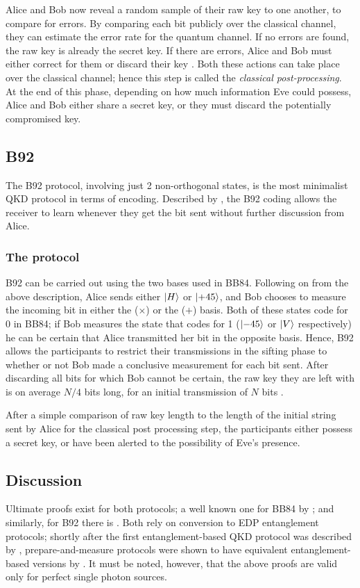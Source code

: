 \documentclass[paper=a4, fontsize=11pt]{scrartcl} %
\numberwithin{equation}{section} %
\numberwithin{figure}{section} %
\numberwithin{table}{section} %
\begin{document}
Alice and Bob now reveal a random sample of their raw key to one another, to compare for errors. By
comparing each bit publicly over the classical channel, they can estimate the error rate for
the quantum channel. If no errors are found, the raw key is already the secret key. If there are
errors, Alice and Bob must either correct for them or discard their key \citep{reviewScariani}. Both these actions can
take place over the classical channel; hence this step is called the \textit{classical post-processing}.
At the end of this phase, depending on how much information Eve could possess, Alice and Bob either share
a secret key, or they must discard the potentially compromised key.

\subsection{B92}
The B92 protocol, involving just 2 non-orthogonal states, is the
most minimalist QKD protocol in terms of encoding. Described by \citet{B92},
the B92 coding allows the receiver to learn whenever they get
the bit sent without further discussion from Alice.

\subsubsection*{The protocol}
B92 can be carried out using the two bases used in BB84. Following on from the above description, Alice sends either
$\ket{H}$ or $\ket{+45}$, and Bob chooses to measure the incoming bit in either the ($\times$) or the ($+$)
basis. Both of these states code for 0 in BB84; if Bob measures the state that codes for 1 ($\ket{-45}$ or
$\ket{V}$ respectively) he can be certain that Alice transmitted her bit in the opposite basis. Hence, B92
allows the participants to restrict their transmissions in the sifting phase to whether or not Bob made
a conclusive measurement for each bit sent. After discarding all bits for which Bob cannot be certain, the raw
key they are left with is on average $N/4$ bits long, for an initial transmission of $N$ bits \citep{B92}.

After a simple comparison of raw key length to the length of the initial string sent by Alice for the classical
post processing step, the participants either possess a secret key, or have been alerted to the possibility
of Eve's presence.

\subsection{Discussion}
Ultimate proofs exist for both protocols; a well known one for BB84
by \citet{proofBB84}; and similarly, for B92 there is \citet{tamakiProofB92}. Both rely on
conversion to EDP entanglement protocols; shortly after the first entanglement-based QKD protocol was
described by \citet{E91}, prepare-and-measure protocols were shown to have equivalent entanglement-based
versions by \citet{edpEquivProof}. It must be noted, however, that the above proofs are valid only
for perfect single photon sources.
\end{document}
